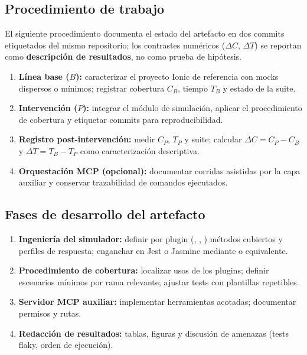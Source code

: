 \subsection{Procedimiento de trabajo}
\label{sec:diseno_experimental}
El siguiente procedimiento documenta el estado del artefacto en dos commits etiquetados del mismo repositorio; los contrastes numéricos ($\Delta C$, $\Delta T$) se reportan como \textbf{descripción de resultados}, no como prueba de hipótesis.
\begin{enumerate}
    \item \textbf{Línea base ($B$):} caracterizar el proyecto Ionic de referencia con mocks dispersos o mínimos; registrar cobertura $C_B$, tiempo $T_B$ y estado de la suite.
    \item \textbf{Intervención ($P$):} integrar el módulo de simulación, aplicar el procedimiento de cobertura y etiquetar commits para reproducibilidad.
    \item \textbf{Registro post-intervención:} medir $C_P$, $T_P$ y suite; calcular $\Delta C = C_P - C_B$ y $\Delta T = T_B - T_P$ como caracterización descriptiva.
    \item \textbf{Orquestación MCP (opcional):} documentar corridas asistidas por la capa auxiliar y conservar trazabilidad de comandos ejecutados.
\end{enumerate}

\subsection{Fases de desarrollo del artefacto}
\label{sec:fases_desarrollo}
\begin{enumerate}
    \item \textbf{Ingeniería del simulador:} definir por plugin (, , ) métodos cubiertos y perfiles de respuesta; enganchar en Jest o Jasmine mediante  o equivalente.
    \item \textbf{Procedimiento de cobertura:} localizar usos de los plugins; definir escenarios mínimos por rama relevante; ajustar tests con plantillas repetibles.
    \item \textbf{Servidor MCP auxiliar:} implementar herramientas acotadas; documentar permisos y rutas.
    \item \textbf{Redacción de resultados:} tablas, figuras y discusión de amenazas (tests flaky, orden de ejecución).
\end{enumerate}

